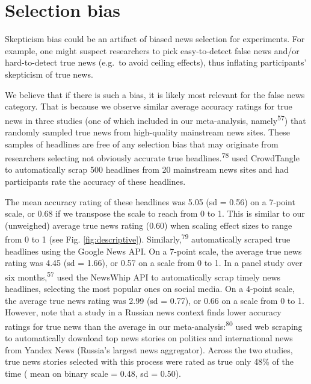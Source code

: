 \documentclass[
  man]{apa6}
\begin{document}
\clearpage

\section{Selection bias}\label{selection-bias}

Skepticism bias could be an artifact of biased news selection for experiments. For example, one might suspect researchers to pick easy-to-detect false news and/or hard-to-detect true news (e.g.~to avoid ceiling effects), thus inflating participants' skepticism of true news.

We believe that if there is such a bias, it is likely most relevant for the false news category. That is because we observe similar average accuracy ratings for true news in three studies (one of which included in our meta-analysis, namely\textsuperscript{57}) that randomly sampled true news from high-quality mainstream news sites. These samples of headlines are free of any selection bias that may originate from researchers selecting not obviously accurate true headlines.\textsuperscript{78} used CrowdTangle to automatically scrap 500 headlines from 20 mainstream news sites and had participants rate the accuracy of these headlines.

The mean accuracy rating of these headlines was 5.05 (sd = 0.56) on a 7-point scale, or 0.68 if we transpose the scale to reach from 0 to 1. This is similar to our (unweighed) average true news rating (0.60) when scaling effect sizes to range from 0 to 1 (see Fig. \ref{fig:descriptive}). Similarly,\textsuperscript{79} automatically scraped true headlines using the Google News API. On a 7-point scale, the average true news rating was 4.45 (sd = 1.66), or 0.57 on a scale from 0 to 1. In a panel study over six months,\textsuperscript{57} used the NewsWhip API to automatically scrap timely news headlines, selecting the most popular ones on social media. On a 4-point scale, the average true news rating was 2.99 (sd = 0.77), or 0.66 on a scale from 0 to 1. However, note that a study in a Russian news context finds lower accuracy ratings for true news than the average in our meta-analysis:\textsuperscript{80} used web scraping to automatically download top news stories on politics and international news from Yandex News (Russia's largest news aggregator). Across the two studies, true news stories selected with this process were rated as true only 48\% of the time ( mean on binary scale = 0.48, sd = 0.50).
\end{document}
